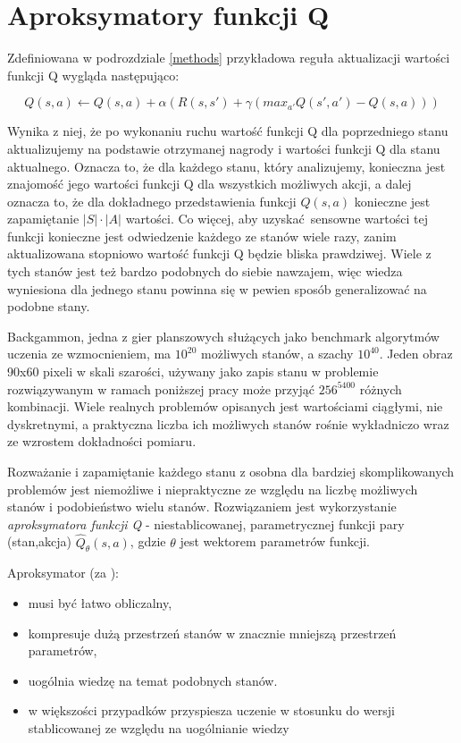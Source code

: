 \section{Aproksymatory funkcji Q}

Zdefiniowana w podrozdziale \ref{methods} przykładowa reguła aktualizacji wartości funkcji Q wygląda następująco:

$$Q(s,a) \leftarrow Q(s,a) + \alpha (R(s,s') + \gamma (max_{a'}Q(s',a') - Q (s,a)))$$

Wynika z niej, że po wykonaniu ruchu wartość funkcji Q dla poprzedniego stanu aktualizujemy na podstawie otrzymanej nagrody i wartości funkcji Q dla stanu aktualnego. Oznacza to, że dla każdego stanu, który analizujemy, konieczna jest znajomość jego wartości funkcji Q dla wszystkich możliwych akcji, a dalej oznacza to, że dla dokładnego przedstawienia funkcji $Q(s,a)$  konieczne jest zapamiętanie $\left\vert{S}\right\vert \cdot \left\vert{A}\right\vert$ wartości. Co więcej, aby uzyskać sensowne wartości tej funkcji konieczne jest odwiedzenie każdego ze stanów wiele razy, zanim aktualizowana stopniowo wartość funkcji Q będzie bliska prawdziwej. Wiele z tych stanów jest też bardzo podobnych do siebie nawzajem, więc wiedza wyniesiona dla jednego stanu powinna się w pewien sposób generalizować na podobne stany.

Backgammon, jedna z gier planszowych służących jako benchmark algorytmów uczenia ze wzmocnieniem, ma $10^{20}$ możliwych stanów, a szachy $10^{40}$. Jeden obraz 90x60 pixeli w skali szarości, używany jako zapis stanu w problemie rozwiązywanym w ramach poniższej pracy może przyjąć $256^{5400}$ różnych kombinacji. Wiele realnych problemów opisanych jest wartościami ciągłymi, nie dyskretnymi, a praktyczna liczba ich możliwych stanów rośnie wykładniczo wraz ze wzrostem dokładności pomiaru.

Rozważanie i zapamiętanie każdego stanu z osobna dla bardziej skomplikowanych problemów jest niemożliwe i niepraktyczne ze względu na liczbę możliwych stanów i podobieństwo wielu stanów. Rozwiązaniem jest wykorzystanie \textit {aproksymatora funkcji Q} - niestablicowanej, parametrycznej funkcji pary (stan,akcja) $\hat{Q}_{\theta}(s,a)$, gdzie $\theta$ jest wektorem parametrów funkcji.


Aproksymator (za \cite{wjaskowski2016}):
\begin{itemize}
\item musi być łatwo obliczalny,
\item kompresuje dużą przestrzeń stanów w znacznie mniejszą przestrzeń parametrów,
\item uogólnia wiedzę na temat podobnych stanów.
\item w większości przypadków przyspiesza uczenie w stosunku do wersji stablicowanej ze względu na uogólnianie wiedzy
\end{itemize}

